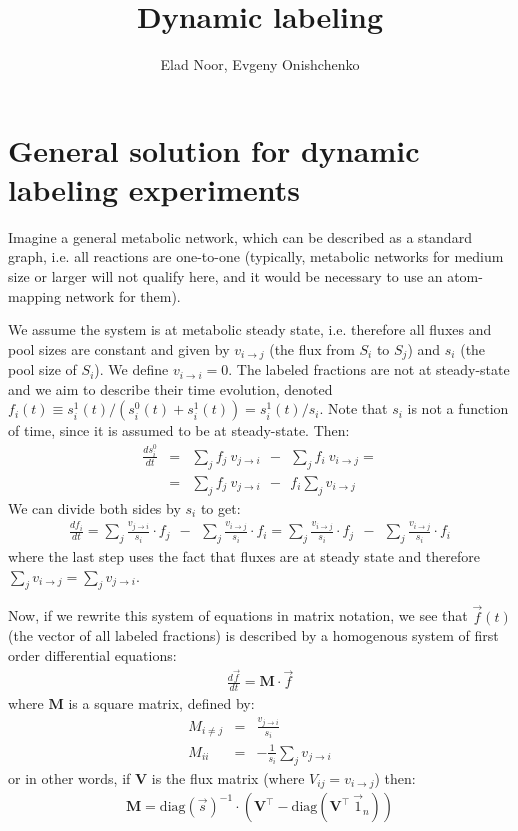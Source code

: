 \documentclass{article}
\title{Dynamic labeling}
\author{Elad Noor, Evgeny Onishchenko}
\begin{document}
\maketitle

\section{General solution for dynamic labeling experiments}
Imagine a general metabolic network, which can be described as a standard graph, i.e. all reactions are one-to-one (typically, metabolic networks for medium size or larger will not qualify here, and it would be necessary to use an atom-mapping network for them).

We assume the system is at metabolic steady state, i.e. therefore all fluxes and pool sizes are constant and given by $v_{i \rightarrow j}$ (the flux from $S_i$ to $S_j$) and $s_i$ (the pool size of $S_i$). We define $v_{i \rightarrow i} = 0$. The labeled fractions are not at steady-state and we aim to describe their time evolution, denoted $f_i(t) \equiv s_i^1(t) / (s_i^0(t) + s_i^1(t)) = s_i^1(t) / s_i$. Note that $s_i$ is not a function of time, since it is assumed to be at steady-state. Then:
\begin{eqnarray}
    \frac{d s_i^0}{dt} &=& \sum_j f_j~v_{j \rightarrow i} ~~-~~ \sum_j f_i~v_{i \rightarrow j} = \\
    &=& \sum_j f_j~v_{j \rightarrow i} ~~-~~ f_i \sum_j v_{i \rightarrow j}
\end{eqnarray}
We can divide both sides by $s_i$ to get:
\begin{eqnarray}
    \frac{d f_i}{dt} = 
    \sum_j \frac{v_{j \rightarrow i}}{s_i} \cdot f_j ~~-~~ \sum_j \frac{v_{i \rightarrow j}}{s_i} \cdot f_i
    = \sum_j \frac{v_{i \rightarrow j}}{s_i} \cdot f_j ~~-~~ \sum_j \frac{v_{i \rightarrow j}}{s_i} \cdot f_i
\end{eqnarray}
where the last step uses the fact that fluxes are at steady state and therefore $\sum_j v_{i \rightarrow j} = \sum_j v_{j \rightarrow i}$.

Now, if we rewrite this system of equations in matrix notation, we see that $\vec{f}(t)$ (the vector of all labeled fractions) is described by a homogenous system of first order differential equations:
\begin{eqnarray}\label{eq:homogenous}
    \frac{d\vec{f}}{d t} = \mathbf{M} \cdot \vec{f}
\end{eqnarray}
where $\mathbf{M}$ is a square matrix, defined by:
\begin{eqnarray}
    M_{i \neq j} &=& \frac{v_{j \rightarrow i}}{s_i}\\
    M_{ii} &=& -\frac{1}{s_i}\sum_{j} v_{j \rightarrow i}
\end{eqnarray}
or in other words, if $\mathbf{V}$ is the flux matrix (where $V_{ij} = v_{i \rightarrow j}$) then:
\begin{eqnarray}
    \mathbf{M} = \text{diag}(\vec{s})^{-1} \cdot \left( \mathbf{V}^\top - \text{diag}(\mathbf{V}^\top~\vec{1}_n) \right)
\end{eqnarray}
\end{document}

